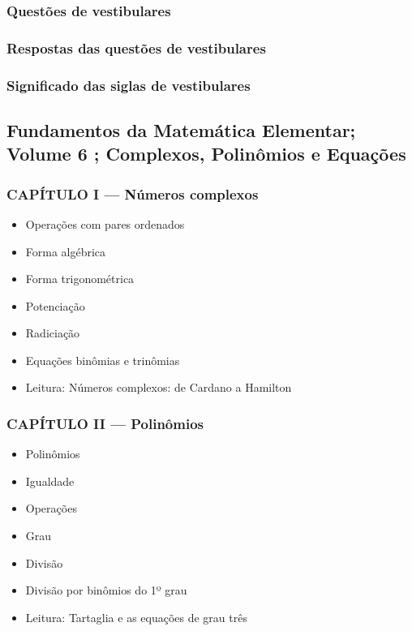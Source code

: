 \documentclass[a4paper,12pt]{article}[abntex2]
\begin{document}
\subsubsection*{Questões de vestibulares}

\subsubsection*{Respostas das questões de vestibulares}

\subsubsection*{Significado das siglas de vestibulares}
 
 \subsection{Fundamentos da Matemática Elementar; Volume 6 ; Complexos, Polinômios e Equações}

\subsubsection*{CAPÍTULO I — Números complexos}

\begin{itemize}
\item Operações com pares ordenados
\item Forma algébrica
\item Forma trigonométrica
\item Potenciação
\item Radiciação
\item Equações binômias e trinômias
\item Leitura: Números complexos: de Cardano a Hamilton
\end{itemize}
\subsubsection*{CAPÍTULO II — Polinômios}

\begin{itemize}
\item Polinômios
\item Igualdade
\item Operações
\item Grau
\item Divisão
\item Divisão por binômios do 1º grau
\item Leitura: Tartaglia e as equações de grau três
\end{itemize}
\end{document}
